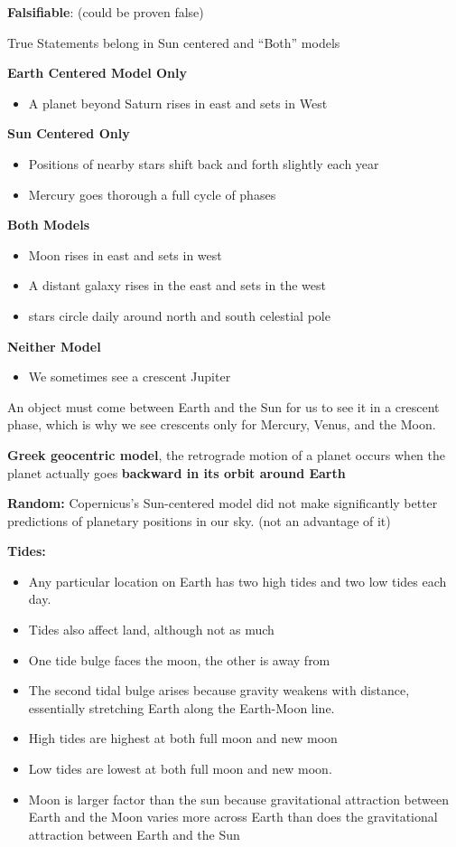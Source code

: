 \documentclass[12pt]{article}
\begin{document}
{\bf Falsifiable}: (could be proven false)

True Statements belong in Sun centered and ``Both'' models

{\bf Earth Centered Model Only}
\begin{itemize}
\item A planet beyond Saturn rises in east and sets in West
\end{itemize}

{\bf Sun Centered Only}
\begin{itemize}
\item Positions of nearby stars shift back and forth slightly each year
\item Mercury goes thorough a full cycle of phases
\end{itemize}

{\bf Both Models}
\begin{itemize}
\item Moon rises in east and sets in west
\item A distant galaxy rises in the east and sets in the west
\item stars circle daily around north and south celestial pole
\end{itemize}

{\bf Neither Model}
\begin{itemize}
\item We sometimes see a crescent Jupiter
\end{itemize}

An object must come between Earth and the Sun for us to see it in a crescent phase, which is why we see crescents only for Mercury, Venus, and the Moon.

{\bf Greek geocentric model}, the retrograde motion of a planet occurs when the planet actually goes {\bf backward in its orbit around Earth }

{\bf Random:} Copernicus's Sun-centered model did not make significantly better predictions of planetary positions in our sky. (not an advantage of it)

{\bf Tides:}
\begin{itemize}
\item Any particular location on Earth has two high tides and two low tides each day.
\item Tides also affect land, although not as much
\item One tide bulge faces the moon, the other is away from
\item The second tidal bulge arises because gravity weakens with distance, essentially stretching Earth along the Earth-Moon line.
\item High tides are highest at both full moon and new moon
\item Low tides are lowest at both full moon and new moon.
\item Moon is larger factor than the sun because gravitational attraction between Earth and the Moon varies more across Earth than does the gravitational attraction between Earth and the Sun
\end{itemize}
\end{document}
